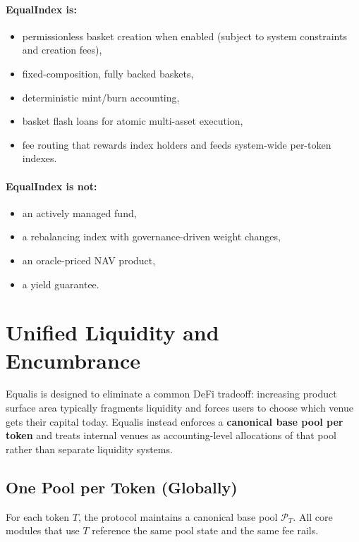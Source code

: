 \documentclass[version=preprint]{iacrcc}
\begin{document}
\paragraph{EqualIndex is:}
\begin{itemize}
  \item permissionless basket creation when enabled (subject to system constraints and creation fees),
  \item fixed-composition, fully backed baskets,
  \item deterministic mint/burn accounting,
  \item basket flash loans for atomic multi-asset execution,
  \item fee routing that rewards index holders and feeds system-wide per-token indexes.
\end{itemize}

\paragraph{EqualIndex is not:}
\begin{itemize}
  \item an actively managed fund,
  \item a rebalancing index with governance-driven weight changes,
  \item an oracle-priced NAV product,
  \item a yield guarantee.
\end{itemize}

\section{Unified Liquidity and Encumbrance}

Equalis is designed to eliminate a common DeFi tradeoff: increasing product surface area typically fragments liquidity and forces users to choose which venue gets their capital today. Equalis instead enforces a \textbf{canonical base pool per token} and treats internal venues as accounting-level allocations of that pool rather than separate liquidity systems.

\subsection{One Pool per Token (Globally)}

For each token $T$, the protocol maintains a canonical base pool $\mathcal{P}_T$. All core modules that use $T$ reference the same pool state and the same fee rails.
\end{document}
